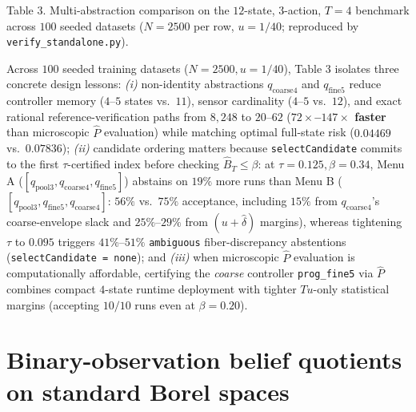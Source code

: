 \documentclass[11pt,a4paper]{article}
\newcounter{none}
\begin{document}
Table 3. Multi-abstraction comparison on the \(12\)-state, \(3\)-action,
\(T=4\) benchmark across \(100\) seeded datasets (\(N=2500\) per row,
\(u = 1/40\); reproduced by \texttt{verify\_standalone.py}).

Across \(100\) seeded training datasets (\(N=2500, u=1/40\)), Table 3
isolates three concrete design lessons: \emph{(i)} non-identity
abstractions \(q_{\mathrm{coarse4}}\) and \(q_{\mathrm{fine5}}\) reduce
controller memory (\(4\)--\(5\) states vs.~\(11\)), sensor cardinality
(\(4\)--\(5\) vs.~\(12\)), and exact rational reference-verification
paths from \(8{,}248\) to \(20\)--\(62\)
(\textbf{\(72\times\)--\(147\times\) faster} than microscopic
\(\widehat{P}\) evaluation) while matching optimal full-state risk
(\(0.04469\) vs.~\(0.07836\)); \emph{(ii)} candidate ordering matters
because \texttt{selectCandidate} commits to the first \(\tau\)-certified
index before checking \(\widehat{B}_T \le \beta\): at
\(\tau = 0.125, \beta = 0.34\), Menu A
(\([q_{\mathrm{pool3}}, q_{\mathrm{coarse4}}, q_{\mathrm{fine5}}]\))
abstains on \(19\%\) more runs than Menu B
(\([q_{\mathrm{pool3}}, q_{\mathrm{fine5}}, q_{\mathrm{coarse4}}]\):
\(56\%\) vs.~\(75\%\) acceptance, including \(15\%\) from
\(q_{\mathrm{coarse4}}\)'s coarse-envelope slack and \(25\%\)--\(29\%\)
from \((u+\widehat{\delta})\) margins), whereas tightening \(\tau\) to
\(0.095\) triggers \(41\%\)--\(51\%\) \texttt{ambiguous}
fiber-discrepancy abstentions (\texttt{selectCandidate\ =\ none}); and
\emph{(iii)} when microscopic \(\widehat{P}\) evaluation is
computationally affordable, certifying the \emph{coarse} controller
\texttt{prog\_fine5} via \(\widehat{P}\) combines compact \(4\)-state
runtime deployment with tighter \(Tu\)-only statistical margins
(accepting \(10/10\) runs even at \(\beta = 0.20\)).

\section{Binary-observation belief quotients on standard Borel
spaces}\label{binary-observation-belief-quotients-on-standard-borel-spaces}
\end{document}
